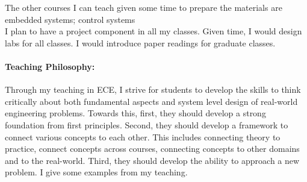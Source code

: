 \documentclass[10pt]{article}
\begin{document}
The other courses I can teach given some time to prepare the materials are embedded systems; control systems\\%

I plan to have a project component in all my classes. Given time, I would design labs for all classes. I would introduce paper readings for graduate classes.\\

\paragraph{Teaching Philosophy: }
Through my teaching in ECE, I strive for students to develop the skills to think critically about both fundamental aspects and system level design of real-world engineering problems. Towards this, first, they should develop a strong foundation from first principles. Second, they should develop a framework to connect various concepts to each other. This includes connecting theory to practice, connect concepts across courses, connecting concepts to other domains and to the real-world. Third, they should develop the ability to approach a new problem. I give some examples from my teaching.\\ %


\end{document}

